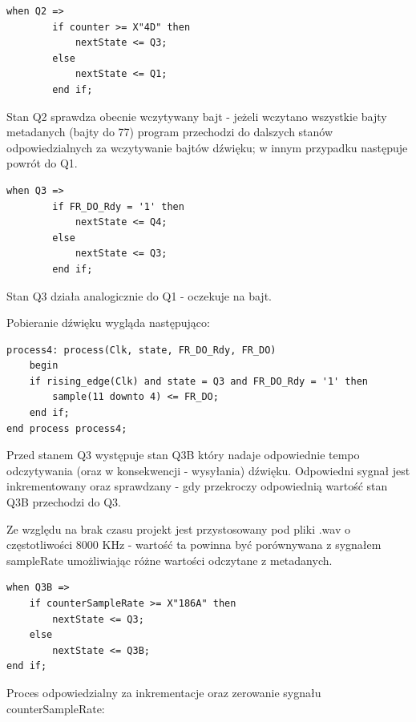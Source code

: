 \documentclass{article}
\begin{document}
\begin{lstlisting}[basicstyle=\small]     
	when Q2 =>      
		if counter >= X"4D" then
			nextState <= Q3;
		else
			nextState <= Q1;
		end if;
\end{lstlisting}
\par Stan Q2 sprawdza obecnie wczytywany bajt - jeżeli wczytano wszystkie bajty metadanych (bajty do 77) program przechodzi do dalszych stanów odpowiedzialnych za wczytywanie bajtów dźwięku; w innym przypadku następuje powrót do Q1.
\begin{lstlisting}[basicstyle=\small]      
	when Q3 => 
		if FR_DO_Rdy = '1' then              
			nextState <= Q4;
		else
			nextState <= Q3;
		end if;
\end{lstlisting}
\par Stan Q3 działa analogicznie do Q1 - oczekuje na bajt.
\par Pobieranie dźwięku wygląda następująco:
\begin{lstlisting}[basicstyle=\small]
process4: process(Clk, state, FR_DO_Rdy, FR_DO)
	begin
	if rising_edge(Clk) and state = Q3 and FR_DO_Rdy = '1' then
		sample(11 downto 4) <= FR_DO;
	end if;
end process process4;
\end{lstlisting}
\par Przed stanem Q3 występuje stan Q3B który nadaje odpowiednie tempo odczytywania (oraz w konsekwencji - wysyłania) dźwięku. Odpowiedni sygnał jest inkrementowany oraz sprawdzany - gdy przekroczy odpowiednią wartość stan Q3B przechodzi do Q3.
\par Ze względu na brak czasu projekt jest przystosowany pod pliki .wav o częstotliwości 8000 KHz - wartość ta powinna być porównywana z sygnałem sampleRate umożliwiając różne wartości odczytane z metadanych.
\begin{lstlisting}[basicstyle=\small]
when Q3B =>
	if counterSampleRate >= X"186A" then          
		nextState <= Q3;
	else 
		nextState <= Q3B;
end if;
\end{lstlisting}
\par Proces odpowiedzialny za inkrementacje oraz zerowanie sygnału counterSampleRate:
\end{document}
